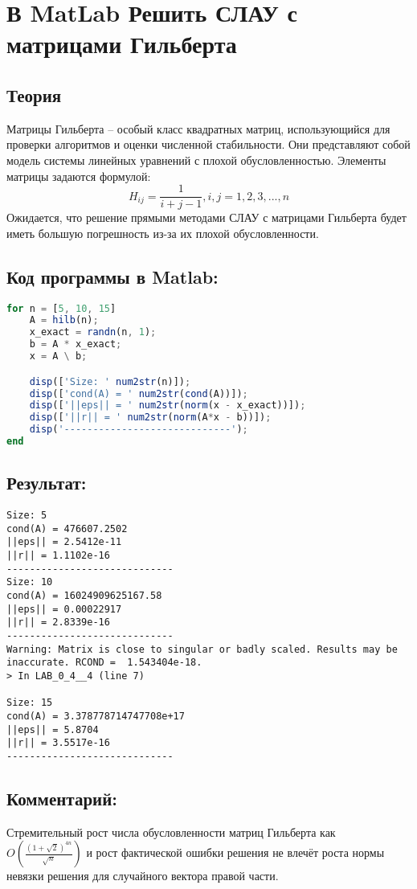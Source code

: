 \clearpage
\section{В MatLab Решить СЛАУ с матрицами Гильберта}
\subsection{Теория}
Матрицы Гильберта -- особый класс квадратных матриц, использующийся для проверки алгоритмов и оценки численной стабильности. Они представляют собой модель системы линейных уравнений с плохой обусловленностью. Элементы матрицы задаются формулой:
\begin{equation}
    H_{ij}={\frac {1}{i+j-1}},i,j=1,2,3,...,n
\end{equation}
Ожидается, что решение прямыми методами СЛАУ с матрицами Гильберта будет иметь большую погрешность из-за их плохой обусловленности.
\subsection{Код программы в Matlab:}
\begin{lstlisting}[language=octave]
for n = [5, 10, 15]
    A = hilb(n);
    x_exact = randn(n, 1);
    b = A * x_exact;
    x = A \ b;

    disp(['Size: ' num2str(n)]);
    disp(['cond(A) = ' num2str(cond(A))]);
    disp(['||eps|| = ' num2str(norm(x - x_exact))]);
    disp(['||r|| = ' num2str(norm(A*x - b))]);
    disp('-----------------------------');
end

\end{lstlisting}
\subsection{Результат:}
{\singlespacing
\begin{verbatim}
Size: 5
cond(A) = 476607.2502
||eps|| = 2.5412e-11
||r|| = 1.1102e-16
-----------------------------
Size: 10
cond(A) = 16024909625167.58
||eps|| = 0.00022917
||r|| = 2.8339e-16
-----------------------------
Warning: Matrix is close to singular or badly scaled. Results may be inaccurate. RCOND =  1.543404e-18.
> In LAB_0_4__4 (line 7)

Size: 15
cond(A) = 3.378778714747708e+17
||eps|| = 5.8704
||r|| = 3.5517e-16
-----------------------------
\end{verbatim}}
\subsection{Комментарий:}
Стремительный рост числа обусловленности матриц Гильберта как $O\left(\frac{(1+\sqrt{2})^{4n}}{\sqrt{n}}\right)$ и рост фактической ошибки решения не влечёт роста нормы невязки решения для случайного вектора правой части.

